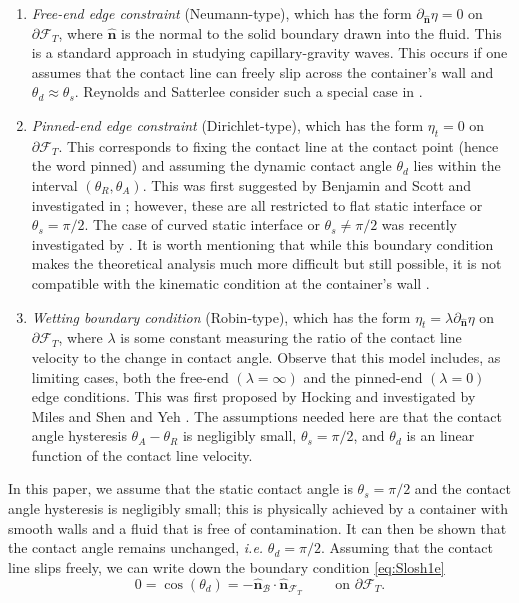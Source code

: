 \documentclass[letterpaper, 12pt]{amsart}
\newcommand{\B}{\mathcal{B}}
\newcommand{\F}{\mathcal{F}}
\newcommand{\n}{\mathbf{\hat{n}}}
\begin{document}
\begin{enumerate}
\item \emph{Free-end edge constraint} (Neumann-type), which has the form 
$\partial_\n\eta = 0$ on $\partial\F_T$, where $\n$ is the normal to the solid boundary drawn into the fluid. This is a standard approach in studying capillary-gravity waves. This occurs if one assumes that the contact line can freely slip across the container's wall and $\theta_d\approx\theta_s$. Reynolds and Satterlee consider such a special case in \cite{Reynolds:1966aa}.

\item \emph{Pinned-end edge constraint} (Dirichlet-type), which has the form $\eta_t=0$ on $\partial\F_T$. This corresponds to fixing the contact line at the contact point (hence the word pinned) and assuming the dynamic contact angle $\theta_d$ lies within the interval $(\theta_R, \theta_A)$. This was first suggested by Benjamin and Scott \cite{Benjamin:1979aa} and investigated in \cite{Graham:1983aa, Graham:1984aa, Benjamin:1985aa, Henderson:1994aa}; however, these are all restricted to flat static interface or $\theta_s=\pi/2$. The case of curved static interface or $\theta_s\neq\pi/2$ was recently investigated by \cite{Shankar:2007aa}. It is worth mentioning that while this boundary condition makes the theoretical analysis much more difficult but still possible, it is not compatible with the kinematic condition at the container's wall \cite{Shankar:2005aa}. 

\item \emph{Wetting boundary condition} (Robin-type), which has the form
$ \eta_t = \lambda\partial_\n\eta$ on $\partial\F_T$, where $\lambda$ is some constant measuring the ratio of the contact line velocity to the change in contact angle. Observe that this model includes, as limiting cases, both the free-end $(\lambda=\infty)$ and the pinned-end $(\lambda=0)$ edge conditions. This was first proposed by Hocking \cite{Hocking:1987aa, Hocking:1987bb} and investigated by Miles  \cite{Miles:1990aa, Miles:1991aa, Miles:1992aa, Miles:1996aa} and Shen and Yeh \cite{Shen:1999aa}. The assumptions needed here are that the contact angle hysteresis $\theta_A-\theta_R$ is negligibly small, $\theta_s=\pi/2$, and $\theta_d$ is an linear function of the contact line velocity. 
\end{enumerate}

In this paper, we assume that the static contact angle is $\theta_s=\pi /2$ and the contact angle hysteresis is negligibly small; this is physically achieved by a container with smooth walls and a fluid that is free of contamination.  It can then be shown  \cite{Shankar:2005aa} that the contact angle remains unchanged, {\it{i.e.}} $\theta_d=\pi/2$. Assuming that the contact line slips freely, we can write down the boundary condition \eqref{eq:Slosh1e}
\[ 0 = \cos(\theta_d) = -\n_\B\cdot\n_{\F_T}\qquad\textrm{ on }\partial\F_T. \]
\end{document}
